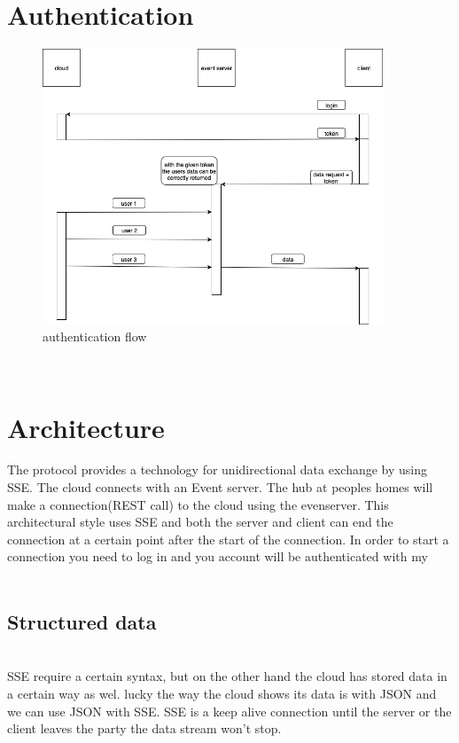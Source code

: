 \documentclass{article}
\begin{document}
\section{Authentication}
	
	\begin{figure}[H]
	\includegraphics[width=4in]{pictures/authenticationFlow.png}
	\caption[Optional caption]{authentication flow}
	\end{figure}\\


\section{Architecture}\label{sec:architecture}
The protocol provides a technology for unidirectional data exchange by using SSE. The cloud connects with an Event server. The hub at peoples homes will make a connection(REST call) to the cloud using the evenserver. This architectural style uses SSE and both the server and client can end the connection at a certain point after the start of the connection.  In order to start a connection you need to log in and you account will be authenticated with my \\
\\
\subsection{Structured data}\label{sec:strucdata} \\
SSE require a certain syntax, but on the other hand the cloud has stored data in a certain way as wel. lucky the way the cloud shows its data is with JSON and we can use JSON with SSE. SSE is a keep alive connection until the server or the client leaves the party the data stream won't stop.\\
\end{document}
